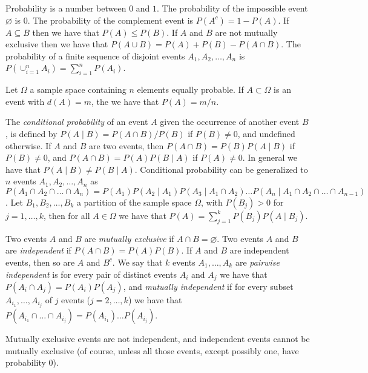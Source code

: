 Probability is a number between $0$ and $1$. The probability of the impossible event $\varnothing$ is $0$. The probability of the complement event is $P(A^c) = 1 - P(A)$. If $A \subseteq B$ then we have that $P(A) \leq P(B)$. If $A$ and $B$ are not mutually exclusive then we have that $P(A \cup B) = P(A) + P(B) - P(A \cap B)$. The probability of a finite sequence of disjoint events $A_1, A_2, \ldots, A_n$ is $P(\cup_{i=1}^n A_i) = \sum_{i=1}^n P(A_i)$.

\begin{example}
Let $\Omega$ a sample space containing $n$ elements equally probable. If $A \subset \Omega$ is an event with $d(A) = m$, the we have that $P(A) = m/n$.
\end{example}

The \emph{conditional probability} of an event $A$ given the occurrence of another event $B$, is defined by $P(A \mid B) = P(A \cap B) / P(B)$ if $P(B) \neq 0$, and undefined otherwise. If $A$ and $B$ are two events, then $P(A \cap B) = P(B) P(A \mid B)$ if $P(B) \neq 0$, and $P(A \cap B) = P(A) P(B \mid A)$ if $P(A) \neq 0$. In general we have that $P(A \mid B) \neq P(B \mid A)$. Conditional probability can be generalized to $n$ events $A_1, A_2, \ldots, A_n$ as $P(A_1 \cap A_2 \cap \ldots \cap A_n) = P(A_1) P(A_2 \mid A_1) P(A_3 \mid A_1 \cap A_2) \ldots P(A_n \mid A_1 \cap A_2 \cap \ldots \cap A_{n-1})$. Let $B_1, B_2, \ldots, B_k$ a partition of the sample space $\Omega$, with $P(B_j) > 0$ for $j = 1, \ldots, k$, then for all $A \in \Omega$ we have that $P(A) = \sum_{j=1}^k P(B_j)P(A \mid B_j)$.

Two events $A$ and $B$ are \emph{mutually exclusive} if $A \cap B = \varnothing$. Two events $A$ and $B$ are \emph{independent} if $P(A \cap B) = P(A)P(B)$. If $A$ and $B$ are independent events, then so are $A$ and $B^c$. We say that $k$ events $A_1, \ldots, A_k$ are \emph{pairwise independent} is for every pair of distinct events $A_i$ and $A_j$ we have that $P(A_i \cap A_j) = P(A_i) P(A_j)$, and \emph{mutually independent} if for every subset $A_{i_1}, \ldots, A_{i_j}$ of $j$ events ($j = 2, \ldots, k$) we have that $P(A_{i_1} \cap \ldots \cap A_{i_j}) = P(A_{i_1}) \ldots P(A_{i_j})$.

\begin{example}
Mutually exclusive events are not independent, and independent events cannot be mutually exclusive (of course, unless all those events, except possibly one, have probability 0).
\end{example}

